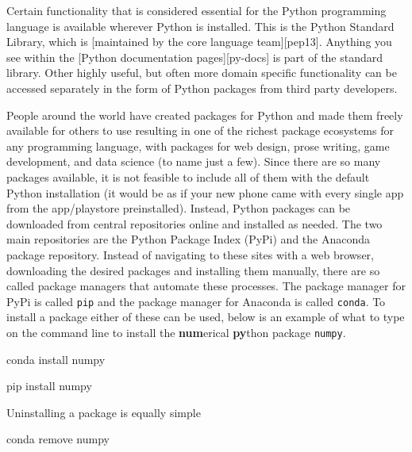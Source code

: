 \documentclass[]{Nemilov}
\newenvironment{Shaded}{\begin{snugshade}}{\end{snugshade}}
\newcommand{\ExtensionTok}[1]{#1}
\newcommand{\NormalTok}[1]{#1}
\begin{document}
Certain functionality that is considered essential for the Python programming language is available wherever Python is installed. This is the Python Standard Library, which is {[}maintained by the core language team{]}{[}pep13{]}. Anything you see within the {[}Python documentation pages{]}{[}py-docs{]} is part of the standard library. Other highly useful, but often more domain specific functionality can be accessed separately in the
form of Python packages from third party developers.

People around the world have created packages for Python and made them freely
available for others to use resulting in one of the richest package ecosystems
for any programming language, with packages for web design, prose writing, game
development, and data science (to name just a few). Since there are so many
packages available, it is not feasible to include all of them with the default
Python installation (it would be as if your new phone came with every single
app from the app/playstore preinstalled). Instead, Python packages can be
downloaded from central repositories online and installed as needed. The two
main repositories are the Python Package Index (PyPi) and the Anaconda package
repository. Instead of navigating to these sites with a web browser,
downloading the desired packages and installing them manually, there are so
called package managers that automate these processes. The package manager for
PyPi is called \texttt{pip} and the package manager for Anaconda is called \texttt{conda}. To
install a package either of these can be used, below is an example of what to
type on the command line to install the \textbf{num}erical \textbf{py}thon package
\texttt{numpy}.

\begin{Shaded}
\begin{Highlighting}[]
\ExtensionTok{conda}\NormalTok{ install numpy}
\end{Highlighting}
\end{Shaded}

\begin{Shaded}
\begin{Highlighting}[]
\ExtensionTok{pip}\NormalTok{ install numpy}
\end{Highlighting}
\end{Shaded}

Uninstalling a package is equally simple

\begin{Shaded}
\begin{Highlighting}[]
\ExtensionTok{conda}\NormalTok{ remove numpy}
\end{Highlighting}
\end{Shaded}
\end{document}
